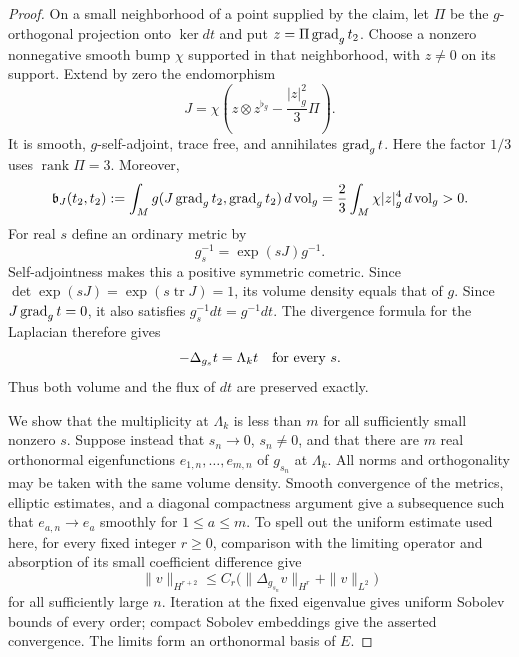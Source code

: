 \begin{proof}
On a small neighborhood of a point supplied by the claim, let $\Pi$ be
the $g$-orthogonal projection onto $\ker dt$ and put
$z=\Pi\operatorname{grad}_g t_2$.  Choose a nonzero nonnegative smooth bump $\chi$
supported in that neighborhood, with $z\ne0$ on its support.  Extend by
zero the endomorphism
\begin{equation}
 J=\chi\left(z\otimes z^{\flat_g}-\frac{|z|_g^2}{3}\Pi\right).
 \label{spec:tangential-variation}
\end{equation}
It is smooth, $g$-self-adjoint, trace free, and annihilates $\operatorname{grad}_g t$.
Here the factor $1/3$ uses $\operatorname{rank}\Pi=3$.  Moreover,
\begin{equation}
 \mathfrak b_J(t_2,t_2)
 :=\int_M g(J\operatorname{grad}_g t_2,\operatorname{grad}_g t_2)\,
                  d\operatorname{vol}_g
 =\frac23\int_M\chi|z|_g^4\,d\operatorname{vol}_g>0.
 \label{spec:positive-variation}
\end{equation}
For real $s$ define an ordinary metric by
\begin{equation}
 g_s^{-1}=\exp(sJ)g^{-1}.
 \label{spec:metric-path}
\end{equation}
Self-adjointness makes this a positive symmetric cometric.  Since
$\det\exp(sJ)=\exp(s\operatorname{tr}J)=1$, its volume density equals
that of $g$.  Since $J\operatorname{grad}_g t=0$, it also satisfies
$g_s^{-1}dt=g^{-1}dt$.  The divergence formula for the Laplacian
therefore gives
\[
 -\Delta_{g_s}t=\Lambda_k t
 \quad\hbox{for every }s.
\]
Thus both volume and the flux of $dt$ are preserved exactly.

We show that the multiplicity at $\Lambda_k$ is less than $m$ for all
sufficiently small nonzero $s$.  Suppose instead that $s_n\to0$,
$s_n\ne0$, and that there are $m$ real orthonormal eigenfunctions
$e_{1,n},\ldots,e_{m,n}$ of $g_{s_n}$ at $\Lambda_k$.  All norms and
orthogonality may be taken with the same volume density.  Smooth
convergence of the metrics, elliptic estimates, and a diagonal compactness
argument give a subsequence such that $e_{a,n}\to e_a$ smoothly for
$1\le a\le m$.  To spell out the uniform estimate used here, for every
fixed integer $r\ge0$, comparison with the limiting operator and
absorption of its small coefficient difference give
\[
 \|v\|_{H^{r+2}}
 \le C_r\bigl(\|\Delta_{g_{s_n}}v\|_{H^r}
                         +\|v\|_{L^2}\bigr)
\]
for all sufficiently large $n$.  Iteration at the fixed eigenvalue gives
uniform Sobolev bounds of every order; compact Sobolev embeddings give
the asserted convergence.  The limits form an orthonormal basis of $E$.


\end{proof}
